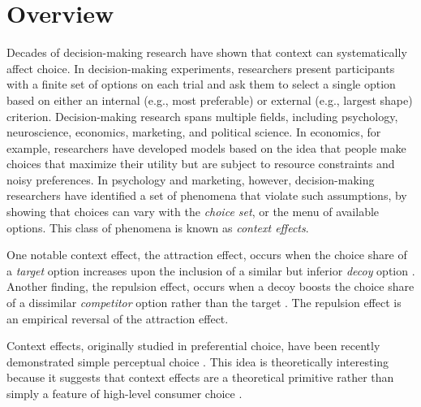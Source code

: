 \section{Overview}
Decades of decision-making research have shown that context can systematically affect choice. In decision-making experiments, researchers present participants with a finite set of options on each trial and ask them to select a single option based on either an internal (e.g., most preferable) or external (e.g., largest shape) criterion. Decision-making research spans multiple fields, including psychology, neuroscience, economics, marketing, and political science. In economics, for example, researchers have developed models based on the idea that people make choices that maximize their utility but are subject to resource constraints and noisy preferences. In psychology and marketing, however, decision-making researchers have identified a set of phenomena that violate such assumptions, by showing that choices can vary with the \textit{choice set}, or the menu of available options. This class of phenomena is known as \textit{context effects}.


One notable context effect, the attraction effect, occurs when the choice share of a \textit{target} option increases upon the inclusion of a similar but inferior \textit{decoy} option \parencite{huberAddingAsymmetricallyDominated1982d}. Another finding, the repulsion effect, occurs when a decoy boosts the choice share of a dissimilar \textit{competitor} option rather than the target \parencite{simonson2014vices}. The repulsion effect is an empirical reversal of the attraction effect. 

Context effects, originally studied in preferential choice, have been recently demonstrated simple perceptual choice \parencite{trueblood2013not,spektorWhenGoodLooks2018b,liaoInfluenceDistanceDecoy2021,spektorRepulsionEffectPreferential2022,yearsleyContextEffectsSimilarity2022,truebloodPhantomDecoyEffect2017c, turnerCompetingTheoriesMultialternative2018a, evansImpactPresentationOrder2021}. This idea is theoretically interesting because it suggests that context effects are a theoretical primitive rather than simply a feature of high-level consumer choice \parencite{trueblood2013not}. 


